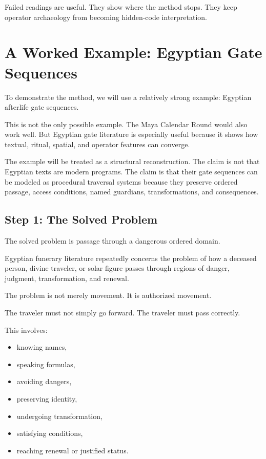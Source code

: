 \documentclass[11pt]{book}
\begin{document}
Failed readings are useful. They show where the method stops. They keep operator archaeology from becoming hidden-code interpretation.

\section{A Worked Example: Egyptian Gate Sequences}

To demonstrate the method, we will use a relatively strong example: Egyptian afterlife gate sequences.

This is not the only possible example. The Maya Calendar Round would also work well. But Egyptian gate literature is especially useful because it shows how textual, ritual, spatial, and operator features can converge.

The example will be treated as a structural reconstruction. The claim is not that Egyptian texts are modern programs. The claim is that their gate sequences can be modeled as procedural traversal systems because they preserve ordered passage, access conditions, named guardians, transformations, and consequences.

\subsection{Step 1: The Solved Problem}

The solved problem is passage through a dangerous ordered domain.

Egyptian funerary literature repeatedly concerns the problem of how a deceased person, divine traveler, or solar figure passes through regions of danger, judgment, transformation, and renewal.

The problem is not merely movement. It is authorized movement.

The traveler must not simply go forward. The traveler must pass correctly.

This involves:

\begin{itemize}
    \item knowing names,
    \item speaking formulas,
    \item avoiding dangers,
    \item preserving identity,
    \item undergoing transformation,
    \item satisfying conditions,
    \item reaching renewal or justified status.
\end{itemize}
\end{document}
